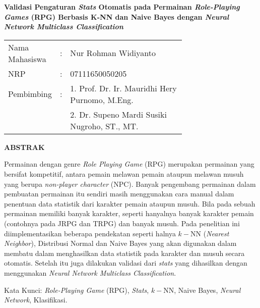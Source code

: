 \begin{spacing}{1}
	\begin{center}
		\Large\textbf{Validasi Pengaturan \textit{Stats} Otomatis pada Permainan \textit{Role-Playing Games} (RPG) Berbasis K-NN dan Naive Bayes dengan \textit{Neural Network Multiclass Classification}}
	\end{center}
	\vspace{2ex}
	
	\begin{adjustwidth}{-0.2cm}{}
		\begin{tabular}{lcp{0.7\linewidth}}
			Nama Mahasiswa &:& Nur Rohman Widiyanto \\
			NRP &:&	07111650050205 \\
			Pembimbing &:& 1. Prof. Dr. Ir. Mauridhi Hery Purnomo, M.Eng. \\
			& & 2. Dr. Supeno Mardi Susiki Nugroho, ST., MT. \\
		\end{tabular}
	\end{adjustwidth}
	\vspace{2ex}
	
	\begin{center}
		\Large\textbf{ABSTRAK}
	\end{center}
	\vspace{1ex}
	
	Permainan dengan genre \textit{Role Playing Game} (RPG) merupakan permainan yang bersifat kompetitif, antara pemain melawan pemain ataupun melawan musuh yang berupa \textit{non-player character} (NPC). Banyak pengembang permainan dalam pembuatan permainan itu sendiri masih menggunakan cara manual dalam penentuan data statistik dari karakter pemain ataupun musuh. Bila pada sebuah permainan memiliki banyak karakter, seperti hanyalnya banyak karakter pemain (contohnya pada JRPG dan TRPG) dan banyak musuh. Pada penelitian ini diimplementasikan beberapa pendekatan seperti halnya $k-$NN (\textit{Nearest Neighbor}), Distribusi Normal dan Naive Bayes yang akan digunakan dalam membatu dalam menghasilkan data statistik pada karakter dan musuh secara otomatis. Setelah itu juga dilakukan validasi dari \textit{stats} yang dihasilkan dengan menggunakan \textit{Neural Network Multiclass Classification}.
	\vspace{2ex}
	

	Kata Kunci: \textit{Role-Playing Game} (RPG), \textit{Stats}, $k-$NN, Naive Bayes, \textit{Neural Network}, Klasifikasi.
\end{spacing}